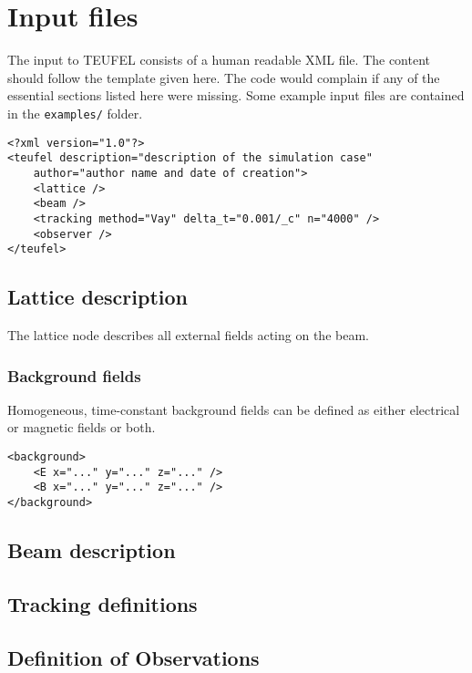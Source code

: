\documentclass[11pt]{article}
\begin{document}
\section{Input files}

The input to TEUFEL consists of a human readable XML file. The content should follow
the template given here. The code would complain if any of the essential sections
listed here were missing. Some example input files are contained in the \verb|examples/| folder.

\begin{lstlisting}
<?xml version="1.0"?>
<teufel description="description of the simulation case"
    author="author name and date of creation">
    <lattice />
    <beam />
    <tracking method="Vay" delta_t="0.001/_c" n="4000" />
    <observer />
</teufel>
\end{lstlisting}

\subsection{Lattice description}

The lattice node describes all external fields acting on the beam.

\subsubsection{Background fields}
Homogeneous, time-constant background fields can be defined as either electrical or magnetic
fields or both.
\begin{lstlisting}
<background>
    <E x="..." y="..." z="..." />
    <B x="..." y="..." z="..." />
</background>
\end{lstlisting}


\subsection{Beam description}


\subsection{Tracking definitions}


\subsection{Definition of Observations}
\end{document}
